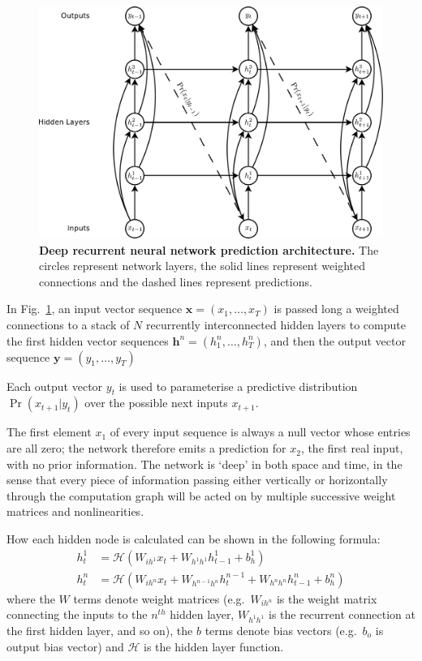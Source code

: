 \documentclass{article} %
\newcommand{\fref}[1]{Fig.~\ref{fig:#1}}
\newcommand{\flabel}[1]{\label{fig:#1}}
\begin{document}
\begin{figure}
\begin{center}
\includegraphics[scale = 0.3]{deep_predictor.pdf}
\caption{\textbf{Deep recurrent neural network prediction architecture.} The circles represent network layers, the solid lines represent weighted connections
and the dashed lines represent predictions. }
\flabel{deep_predictor}
\end{center}
\end{figure}

In \fref{deep_predictor}, an input vector sequence $\mathbf{x}=(x_1, \ldots, x_T)$ is passed long a weighted connections to a stack of $N$ recurrently interconnected hidden layers to compute the first hidden vector sequences $\mathbf{h}^n = (h^n_1,\ldots,h^n_T)$, and then the output vector sequence $\mathbf{y} = (y_1, \ldots, y_T)$

Each output vector $y_t$ is used to parameterise a predictive distribution $\Pr(x_{t+1}|y_t)$ over the possible next inputs $x_{t+1}$.

The first element $x_1$ of every input sequence is always a null vector whose entries are all zero; the network therefore emits a prediction for $x_2$, the first real input, with no prior information.
The network is `deep' in both space and time, in the sense that every piece of information passing either vertically or horizontally through the computation graph will be acted on by multiple successive weight matrices and nonlinearities.

How each hidden node is calculated can be shown in the following formula: 
\begin{align}
\label{eq:pred_hidden}
h^1_t &= \mathcal{H}\left(W_{i h^1} x_t + W_{h^{1}h^{1}} h^1_{t-1} + b_{h}^1 \right)\\
h^n_t &= \mathcal{H}\left(W_{i h^n} x_t + W_{h^{n-1}h^{n}} h^{n-1}_t + W_{h^{n}h^{n}} h^n_{t-1} + b_h^n \right)
\end{align} 
where the $W$ terms denote weight matrices (e.g.\ $W_{i h^n}$ is the weight matrix connecting the inputs to the $n^{th}$ hidden layer, $W_{h^{1}h^{1}}$ is the recurrent connection at the first hidden layer, and so on), the $b$ terms denote bias vectors (e.g.\ $b_o$ is output bias vector) and $\mathcal{H}$ is the hidden layer function. 
\end{document}

